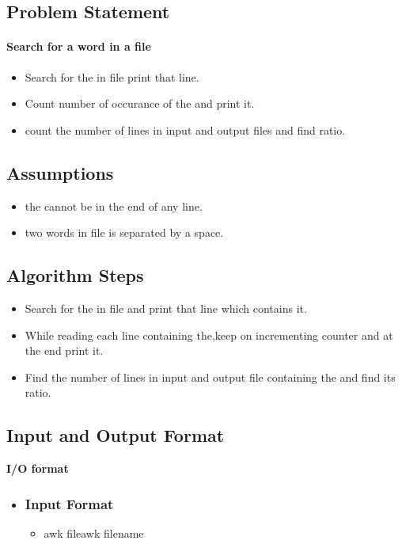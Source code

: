 \documentclass[11pt]{article}
\begin{document}
{{\subsection{Problem Statement}
\paragraph{ Search for a word in a file} 
\begin{itemize}
\item Search for the in file print that line.
\item Count number of occurance of the and print it.
\item count the number of lines in input and output files and find ratio.
\end{itemize}
} 

\subsection{Assumptions}
{
\begin{itemize}
\item the cannot be in the end of any line.
\item two words in file is separated by a space.
\end{itemize}
}




\subsection{Algorithm Steps}
{
\begin{itemize}
\item Search for the in file and print that line which contains it.
\item While reading each line containing the,keep on incrementing counter and at the end print it.
\item Find the number of lines in input and output file containing the and find its ratio.
\end{itemize}

\subsection{Input and Output Format}
{


\textbf{I/O format} 
\begin{itemize}
\item \subsubsection{Input Format}
\begin{itemize}
\item  awk fileawk filename 
\end{itemize}


\end{itemize}}}}
\end{document}
